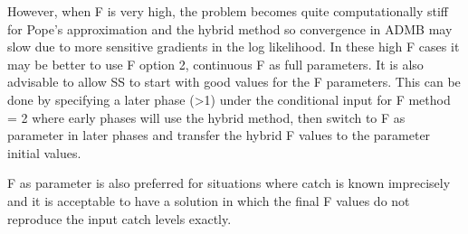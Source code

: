 However, when F is very high, the problem becomes quite computationally stiff for Pope's approximation and the hybrid method so convergence in ADMB may slow due to more sensitive gradients in the log likelihood. In these high F cases it may  be better to use F option 2, continuous F as full parameters. It is also advisable to allow SS to start with good values for the F parameters.  This can be done by specifying a later phase (>1) under the conditional input for F method = 2 where early phases will use the hybrid method, then switch to F as parameter in later phases and transfer the hybrid F values to the parameter initial values.

F as parameter is also preferred for situations where catch is known imprecisely and it is acceptable to have a solution in which the final F values do not reproduce the input catch levels exactly. 

